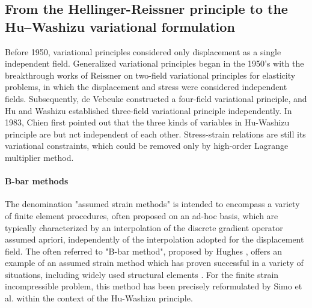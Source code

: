 
\subsection{From the Hellinger-Reissner principle to the Hu–Washizu variational formulation}

Before 1950, variational principles considered only displacement
as a single independent field.
Generalized variational principles began in the 1950's with the
breakthrough works of Reissner \cite{reissner_variational_1950} on two-field variational principles for elasticity problems, in
which the displacement and stress were considered independent fields. Subsequently, de Vebeuke \cite{fraeijs_de_veubeke_diffusion_1951} constructed a
four-field variational principle, and Hu \cite{hu_variational_1954} and Washizu \cite{washizu_variational_1955} established three-field variational
principle independently.
In 1983, Chien \cite{chien_method_1983} first pointed out that the three kinds of
variables in Hu-Washizu principle are but nct independent
of each other. Stress-strain relations are still its variational
constraints, which could be removed only by high-order
Lagrange multiplier method.

\paragraph{B-bar methods}

The denomination "assumed strain methods" is intended to encompass a variety of finite element procedures, often proposed on an ad-hoc basis, which are typically characterized by an interpolation of the discrete gradient operator assumed apriori, independently of the interpolation adopted for the displacement field. The often referred to "B-bar method", proposed by Hughes \cite{belytschko_ac0_1984}, offers an example of an assumed strain method which has proven successful in a variety of situations, including widely used structural elements \cite{hughes_finite_1981}. For the finite strain incompressible problem, this method has been precisely reformulated by Simo et al. \cite{simo_variational_1985} within the context of the Hu-Washizu principle.

